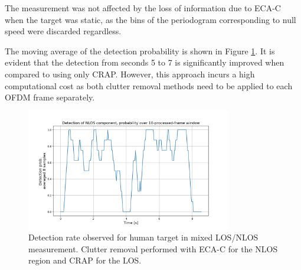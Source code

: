 The measurement was not affected by the loss of information due to ECA-C when the target was static, as the bins of the periodogram corresponding to null speed were discarded regardless.

The moving average of the detection probability is shown in Figure \ref{fig:Test1_mov_avg_crap_ecac}.
It is evident that the detection from seconds 5 to 7 is significantly improved when compared to using only CRAP.
However, this approach incurs a high computational cost as both clutter removal methods need to be applied to each OFDM frame separately.

\begin{figure}[H]
	\centering
	\includegraphics[width=0.8\textwidth]{Images/Test1/ECAC_CRAP_mixed/movavg_6frames_mixedecac-crap_stride4_exp_thresh.png}
	\caption{\small Detection rate observed for human target in mixed LOS/NLOS measurement. Clutter removal performed with ECA-C for the NLOS region and CRAP for the LOS.}
	\label{fig:Test1_mov_avg_crap_ecac}
\end{figure}
